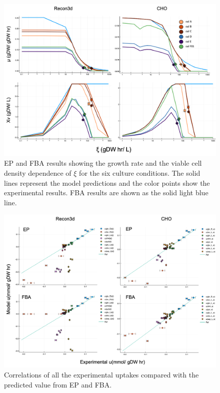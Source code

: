 	\begin{figure}
		\includegraphics[scale = 0.5]{rich_medium_1}
		\caption{EP and FBA results showing the growth rate and the viable cell density dependence of $\xi$ for the six culture conditions. The solid lines represent the model predictions and the color points show the experimental results. FBA results are shown as the solid light blue line.}
		
	\end{figure}
	
	\begin{figure}
		\includegraphics[scale = 0.5]{rich_medium_2}
		\caption{Correlations of all the experimental uptakes compared with the predicted value from EP and FBA.}
		
	\end{figure}
	
